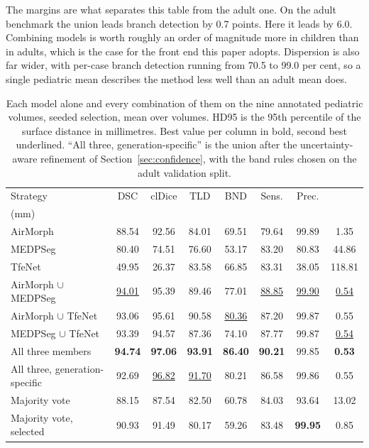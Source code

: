 \documentclass[runningheads]{llncs}
\newcommand{\hd}[1]{\makecell[c]{#1}}
\begin{document}
The margins are what separates this table from the adult one. On the adult
benchmark the union leads branch detection by 0.7 points. Here it leads by 6.0.
Combining models is worth roughly an order of magnitude more in children than in
adults, which is the case for the front end this paper adopts. Dispersion is
also far wider, with per-case branch detection running from 70.5 to 99.0 per
cent, so a single pediatric mean describes the method less well than an adult
mean does.

\begin{table}[tbp]
\centering
\caption{Each model alone and every combination of them on the nine annotated
pediatric volumes, seeded selection, mean over volumes. HD95 is the 95th
percentile of the surface distance in millimetres. Best value per column in
bold, second best underlined. ``All three, generation-specific'' is the union after the uncertainty-aware refinement of Section~\ref{sec:confidence}, with the band rules chosen on the adult validation split.}
\label{tab:ped}
\setlength{\tabcolsep}{3.5pt}\footnotesize
\begin{tabular}{@{}lccccccc@{}}
\toprule
Strategy & DSC & clDice & TLD & BND & Sens. & Prec. & \hd{HD95\\(mm)} \\
\midrule
AirMorph & 88.54 & 92.56 & 84.01 & 69.51 & 79.64 & 99.89 & 1.35 \\
MEDPSeg & 80.40 & 74.51 & 76.60 & 53.17 & 83.20 & 80.83 & 44.86 \\
TfeNet & 49.95 & 26.37 & 83.58 & 66.85 & 83.31 & 38.05 & 118.81 \\
\midrule
AirMorph $\cup$ MEDPSeg & \underline{94.01} & 95.39 & 89.46 & 77.01 & \underline{88.85} & \underline{99.90} & \underline{0.54} \\
AirMorph $\cup$ TfeNet & 93.06 & 95.61 & 90.58 & \underline{80.36} & 87.20 & 99.87 & 0.55 \\
MEDPSeg $\cup$ TfeNet & 93.39 & 94.57 & 87.36 & 74.10 & 87.77 & 99.87 & \underline{0.54} \\
All three members & \textbf{94.74} & \textbf{97.06} & \textbf{93.91} & \textbf{86.40} & \textbf{90.21} & 99.85 & \textbf{0.53} \\
All three, generation-specific & 92.69 & \underline{96.82} & \underline{91.70} & 80.21 & 86.58 & 99.86 & 0.55 \\
\midrule
Majority vote & 88.15 & 87.54 & 82.50 & 60.78 & 84.03 & 93.64 & 13.02 \\
Majority vote, selected & 90.93 & 91.49 & 80.17 & 59.26 & 83.48 & \textbf{99.95} & 0.85 \\
\bottomrule
\end{tabular}
\end{table}
\end{document}
